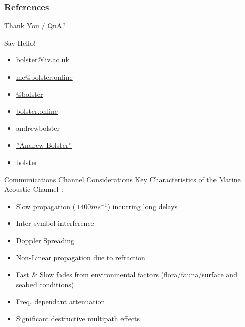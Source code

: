 \documentclass[aspectratio=169]{beamer}
\begin{document}
\begin{frame}[t,allowframebreaks]
  \frametitle{References}
  \printbibliography[title=References]%
\end{frame}

\begin{frame}{\alert{Thank You / QnA?}}
          \begin{center}
          	\begin{minipage}{4cm}
\begin{exampleblock}{Say Hello!}
	\begin{itemize}
		\item[\faEnvelope] \href{mailto:bolster@liv.ac.uk}{bolster@liv.ac.uk}
		\item[\faEnvelope] \href{mailto:me@bolster.online}{me@bolster.online}
		\item[\faTwitter] \href{https://twitter.com/bolster}{@bolster}
		\item[\faSitemap] \href{http://bolster.online}{bolster.online}
		\item[\faGithub] \href{https://github.com/andrewbolster}{andrewbolster}
		\item[\faLinkedin] \href{http://www.linkedin.com/in/andrewbolster}{''Andrew Bolster''}
		\item[\faStackOverflow] \href{http://www.stackoverflow.com/users/252556/bolster}{bolster}
	\end{itemize}
\end{exampleblock}
\end{minipage}
\end{center}
\end{frame}

\appendix

\begin{frame}{Communications Channel Considerations}
  Key Characteristics of the Marine Acoustic Channel \autocite{Urick1983a,Partan2006,Stojanovic2007,Stefanov2011}:
  \begin{itemize}
    \item Slow propagation ($~1400ms^{-1}$) incurring long delays
    \item Inter-symbol interference
    \item Doppler Spreading
    \item Non-Linear propagation due to refraction
    \item Fast \& Slow fades from environmental factors (flora/fauna/surface and seabed conditions)
    \item Freq. dependant attenuation
    \item Significant destructive multipath effects
  \end{itemize}

\end{frame}
\end{document}
